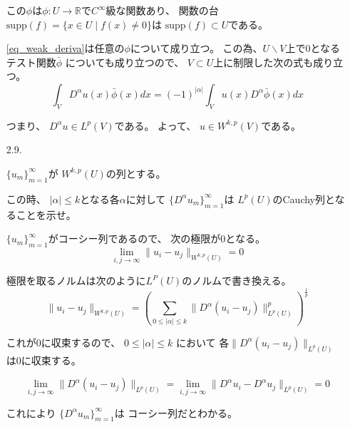 \documentclass[12pt,b5paper]{ltjsarticle}
\begin{document}
\begin{enumerate}
       この$\phi$は$\phi:U\to\mathbb{R}$で$C^{\infty}$級な関数あり、
       関数の台$\mathrm{supp}(f)=\{x\in U \mid f(x)\ne 0\}$は
       $\mathrm{supp}(f) \subset U$である。

       \eqref{eq_weak_deriva}は任意の$\phi$について成り立つ。
       この為、$U\backslash V$上で$0$となるテスト関数$\bar{\phi}$
       についても成り立つので、
       $V\subset U$上に制限した次の式も成り立つ。
       \begin{equation}
        \int_{V} D^{\alpha}u(x) \bar{\phi}(x) dx
         = (-1)^{\lvert \alpha \rvert}\int_{V} u(x) D^{\alpha}\bar{\phi}(x) dx
       \end{equation}

       つまり、
       $D^{\alpha}u \in L^{p}(V)$である。
       よって、
       $u\in W^{k,p}(V)$である。





       \hrulefill

 \item [2.9.]

%


       $\{u_{m}\}_{m=1}^{\infty}$が
       $W^{k,p}(U)$の列とする。

       この時、
       $\lvert \alpha \rvert \leq k$となる各$\alpha$に対して
       $\{D^{\alpha}u_{m}\}_{m=1}^{\infty}$は
       $L^{p}(U)$のCauchy列となることを示せ。

       \dotfill

       $\{u_{m}\}_{m=1}^{\infty}$がコーシー列であるので、
       次の極限が$0$となる。
       \begin{equation}
        \lim_{i,j\to\infty}\| u_{i} - u_{j} \|_{W^{k,p}(U)}=0
       \end{equation}

       極限を取るノルムは次のように$L^{P}(U)$のノルムで書き換える。
       \begin{equation}
        \| u_{i} - u_{j} \|_{W^{k,p}(U)}
         =
         \left(
          \sum_{0\leq \lvert \alpha \rvert \leq k}
          \| D^{\alpha}(u_{i}-u_{j}) \|_{L^{p}(U)}^{p}
         \right)^{\frac{1}{p}}
       \end{equation}

       これが$0$に収束するので、
       $0\leq \lvert \alpha \rvert \leq k$
       において
       各$\| D^{\alpha}(u_{i}-u_{j}) \|_{L^{p}(U)}$
       は$0$に収束する。

       \begin{equation}
        \lim_{i,j\to\infty} \| D^{\alpha}(u_{i}-u_{j}) \|_{L^{p}(U)}
         =
         \lim_{i,j\to\infty} \| D^{\alpha}u_{i} - D^{\alpha}u_{j} \|_{L^{p}(U)}
         =0
       \end{equation}

       これにより
       $\{D^{\alpha}u_{m}\}_{m=1}^{\infty}$は
       コーシー列だとわかる。
       
       \hrulefill

\end{enumerate}

\hrulefill
\end{document}
